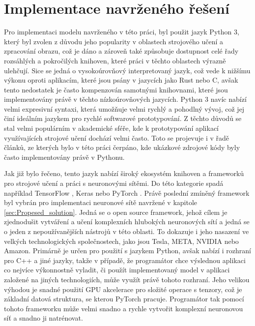\chapter{Implementace navrženého řešení}
Pro implementaci modelu navrženého v této práci, byl použit jazyk Python 3, který byl zvolen z důvodu jeho popularity v oblastech strojového učení a zpracování obrazu, což je dáno a zároveň také způsobuje dostupnost celé řady rozsáhlých a pokročilých knihoven, které práci v těchto oblastech výrazně ulehčují.
Sice se jedná o vysokoúrovňový interpretovaný jazyk, což vede k nižšímu výkonu oproti aplikacím, které jsou psány v jazycích jako Rust nebo C, avšak tento nedostatek je často kompenzován samotnými knihovnami, které jsou implementovány právě v těchto nízkoúrovňových jazycích.
Python 3 navíc nabízí velmi expresivní syntaxi, která umožňuje velmi rychlý a pohodlný vývoj, což jej činí ideálním jazykem pro rychlé softwarové prototypování.
Z těchto důvodů se stal velmi populárním v akademické sféře, kde k prototypování aplikací využívajících strojové učení dochází velmi často.
Toto se projevuje i v řadě článků, ze kterých bylo v této práci čerpáno, kde ukázkové zdrojové kódy byly často implementovány právě v Pythonu.

Jak již bylo řečeno, tento jazyk nabízí široký ekosystém knihoven a frameworků pro strojové učení a práci s neuronovými sítěmi.
Do této kategorie spadá například TensorFlow \cite{tensorflow}, Keras \cite{Keras} nebo PyTorch \cite{PyTorch}.
Právě poslední zmíněný framework byl vybrán pro implementaci neuronové sítě navržené v kapitole \ref{sec:Propesed_solution}.
Jedná se o open source framework, jehož cílem je zjednodušit vytváření a učení komplexních hlubokých neuronových sítí a jedná se o jeden z nepoužívanějších nástrojů v této oblasti.
To dokazuje i jeho nasazení ve velkých technologických společnostech, jako jsou Tesla, META, NVIDIA nebo Amazon.
Primárně je určen pro použití s jazykem Python, avšak nabízí i rozhraní pro C++ a jiné jazyky, takže v případě, že programátor chce výslednou aplikaci co nejvíce výkonnostně vyladit, či použít implementovaný model v aplikaci založené na jiných technologiích, může využít právě tohoto rozhraní.
Jeho velikou výhodou je snadné použití GPU akcelerace pro složité operace s tenzory, což je základní datová struktura, se kterou PyTorch pracuje.
Programátor tak pomocí tohoto frameworku může velmi snadno a rychle vytvořit komplexní neuronovou síť a snadno ji natrénovat.

